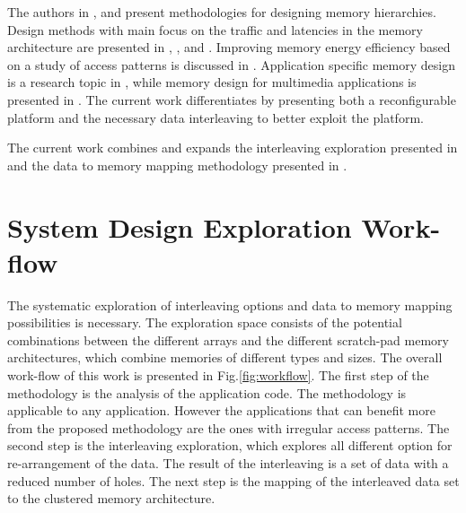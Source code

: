 \documentclass[prodmode,acmtodaes]{acmsmall}
\begin{document}
The authors in \cite{abraham1999automatic}, \cite{jacob1996analytical} and \cite{li1999hardware} present methodologies for designing memory hierarchies.
Design methods with main focus on the traffic and latencies in the memory architecture are presented in \cite{chen1999loop}, \cite{grun2000mist}, \cite{jantsch1994hardware} and \cite{passes1995multi}.
Improving memory energy efficiency based on a study of access patterns is discussed in \cite{kandemir2001improving}.
Application specific memory design is a research topic in \cite{schmit1997synthesis}, while memory design for multimedia applications is presented in \cite{oshima1997high}.
The current work differentiates by presenting both a reconfigurable platform and the necessary data interleaving to better exploit the platform.

The current work combines and expands the interleaving exploration presented in \cite{sharma2013data} and the data to memory mapping methodology presented in \cite{filippopoulos2013exploration}. 

\section{System Design Exploration Work-flow}
\label{sec:methodology}

The systematic exploration of interleaving options and data to memory mapping possibilities is necessary.
The exploration space consists of the potential combinations between the different arrays and the different scratch-pad memory architectures, which combine memories of different types and sizes.
The overall work-flow of this work is presented in Fig.\ref{fig:workflow}. 
The first step of the methodology is the analysis of the application code. 
The methodology is applicable to any application.
However the applications that can benefit more from the proposed methodology are the ones with irregular access patterns.
The second step is the interleaving exploration, which explores all different option for re-arrangement of the data.
The result of the interleaving is a set of data with a reduced number of holes.
The next step is the mapping of the interleaved data set to the clustered memory architecture.
\end{document}
